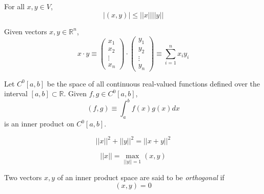 \documentclass{article}
\begin{document}
  \begin{theorem}
    For all $x, y \in V$, 
    \begin{equation}
      |(x, y)| \leq ||x|| ||y||
    \end{equation}
  \end{theorem}

  \begin{example}
    Given vectors $x, y \in \mathbb{R}^n$, 
    \begin{equation}
      x \cdot y \equiv  \begin{pmatrix}
      x_1\\x_2\\\vdots\\x_n
      \end{pmatrix} \cdot \begin{pmatrix}
      y_1\\y_2\\\vdots\\y_n
      \end{pmatrix} \equiv \sum_{i=1}^n x_i y_i
    \end{equation}
  \end{example}

  \begin{example}
    Let $C^0[a, b]$ be the space of all continuous real-valued functions defined over the interval $[a,b] \subset \mathbb{R}$. Given $f, g \in C^0[a,b]$, 
    \begin{equation}
      (f, g) \equiv \int_a^b f(x)g(x) d x
    \end{equation}
    is an inner product on $C^0[a, b]$. 
  \end{example}

  \begin{theorem}
    \begin{equation}
      ||x||^2 + ||y||^2 = ||x+y||^2
    \end{equation}
  \end{theorem}

  \begin{theorem}
    \begin{equation}
      ||x|| = \max_{||y||=1} (x, y)
    \end{equation}
  \end{theorem}

  \begin{definition}
    Two vectors $x, y$ of an inner product space are said to be \textit{orthogonal} if 
    \begin{equation}
      (x, y) = 0
    \end{equation}
  \end{definition}
\end{document}
